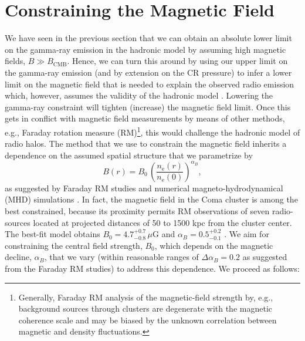\documentclass[12pt,manuscript]{aastex}
\newcommand{\rmn}{\mathrm}
\begin{document}
%
%
 
\section{Constraining the Magnetic Field}
\label{sec:B}
We have seen in the previous section that we can obtain an absolute lower limit on the gamma-ray
emission in the hadronic model by assuming high magnetic fields, $B\gg B_\rmn{CMB}$. Hence, we can
turn this around by using our upper limit on the gamma-ray emission (and by extension on the CR
pressure) to infer a lower limit on the magnetic field that is needed to explain the observed radio
emission which, however, assumes the validity of the hadronic model
\citep{article:PfrommerEnsslin:2004a}. Lowering the gamma-ray constraint will tighten (increase)
the magnetic field limit. Once this gets in conflict with magnetic field measurements by means of
other methods, e.g., Faraday rotation measure (RM)\footnote{Generally, Faraday RM analysis of the
magnetic-field strength by, e.g., background sources through clusters are degenerate with the
magnetic coherence scale and may be biased by the unknown correlation between magnetic and density
fluctuations.}, this would challenge the hadronic model of radio halos. The method that we use to
constrain the magnetic field inherits a dependence on the assumed spatial structure that we
parametrize by
\begin{equation}
\label{eq:B}
B(r) = B_{0} \,\left(\frac{n_{\rmn{e}}(r)}{n_{\rmn{e}}(0)}\right)^{\alpha_B},
\end{equation}
as suggested by Faraday RM studies and numerical magneto-hydrodynamical (MHD) simulations
\citep[][and references therein]{article:Bonafede_etal:2010, article:Bonafede_etal:2011}. In fact,
the magnetic field in the Coma cluster is among the best constrained, because its proximity permits
RM observations of seven radio-sources located at projected distances of 50 to 1500 kpc from the
cluster center. The best-fit model obtains $B_{0} = 4.7^{+0.7}_{-0.8}\,\mu$G and
$\alpha_{B} = 0.5^{+0.2}_{-0.1}$ \citep{article:Bonafede_etal:2010}. We aim for constraining the
central field strength, $B_{0}$, which depends on the magnetic decline, $\alpha_{B}$, that we vary
(within reasonable ranges of $\Delta\alpha_{B}=0.2$ as suggested from the Faraday RM studies) to
address this dependence. We proceed as follows:
\end{document}
